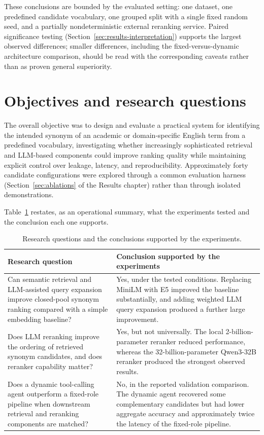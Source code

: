 These conclusions are bounded by the evaluated setting: one dataset, one predefined candidate vocabulary, one grouped split with a single fixed random seed, and a partially nondeterministic external reranking service. Paired significance testing (Section~\ref{sec:results-interpretation}) supports the largest observed differences; smaller differences, including the fixed-versus-dynamic architecture comparison, should be read with the corresponding caveats rather than as proven general superiority.

\section{Objectives and research questions}

The overall objective was to design and evaluate a practical system for identifying the intended synonym of an academic or domain-specific English term from a predefined vocabulary, investigating whether increasingly sophisticated retrieval and LLM-based components could improve ranking quality while maintaining explicit control over leakage, latency, and reproducibility. Approximately forty candidate configurations were explored through a common evaluation harness (Section~\ref{sec:ablations} of the Results chapter) rather than through isolated demonstrations.

Table~\ref{tab:research-questions} restates, as an operational summary, what the experiments tested and the conclusion each one supports.

\begingroup
\footnotesize
\begin{table}[htbp]
\centering
\begin{tabular}{p{5.6cm}p{7.4cm}}
\toprule
\textbf{Research question} & \textbf{Conclusion supported by the experiments}\\
\midrule
Can semantic retrieval and LLM-assisted query expansion improve closed-pool synonym ranking compared with a simple embedding baseline? & Yes, under the tested conditions. Replacing MiniLM with E5 improved the baseline substantially, and adding weighted LLM query expansion produced a further large improvement.\\
Does LLM reranking improve the ordering of retrieved synonym candidates, and does reranker capability matter? & Yes, but not universally. The local 2-billion-parameter reranker reduced performance, whereas the 32-billion-parameter Qwen3-32B reranker produced the strongest observed results.\\
Does a dynamic tool-calling agent outperform a fixed-role pipeline when downstream retrieval and reranking components are matched? & No, in the reported validation comparison. The dynamic agent recovered some complementary candidates but had lower aggregate accuracy and approximately twice the latency of the fixed-role pipeline.\\
\bottomrule
\end{tabular}
\caption{Research questions and the conclusions supported by the experiments.}
\label{tab:research-questions}
\end{table}
\endgroup

